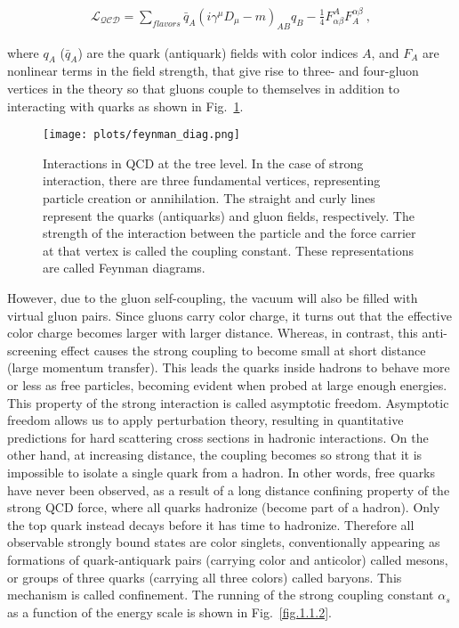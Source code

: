 \begin{equation}
    \label{eq.1.1}
    \begin{aligned}
        \mathcal{L_{QCD}}=\sum_{flavors}\bar{q}_{A}(i\gamma^{\mu}D_{\mu}-m)_{AB}q_{B}-\frac{1}{4}F^{A}_{\alpha\beta}F^{\alpha\beta}_{A}~,
    \end{aligned}
\end{equation}

\noindent where $q_A$ ($\bar{q}_{A}$) are the quark (antiquark) fields with color indices $A$, and $F_{A}$ are nonlinear terms in the field strength, that give rise to three- and four-gluon vertices in the theory so that gluons couple to themselves in addition to interacting with quarks as shown in Fig.~\ref{fig.1.1.1}.

\begin{figure}[H]
    \centering
        \texttt{[image: plots/feynman\_diag.png]}
        \caption{Interactions in QCD at the tree level. In the case of strong interaction, there are three fundamental vertices, representing particle creation or annihilation. The straight and curly lines represent the quarks (antiquarks) and gluon fields, respectively. The strength of the interaction between the particle and the force carrier at that vertex is called the coupling constant. These representations are called Feynman diagrams.}
        \label{fig.1.1.1}
\end{figure}

However, due to the gluon self-coupling, the vacuum will also be filled with virtual gluon pairs. Since gluons carry color charge, it turns out that the effective color charge becomes larger with larger distance. Whereas, in contrast, this anti-screening effect causes the strong coupling to become small at short distance (large momentum transfer). This leads the quarks inside hadrons to behave more or less as free particles, becoming evident when probed at large enough energies. This property of the strong interaction is called asymptotic freedom. Asymptotic freedom allows us to apply perturbation theory, resulting in quantitative predictions for hard scattering cross sections in hadronic interactions. On the other hand, at increasing distance, the coupling becomes so strong that it is impossible to isolate a single quark from a hadron. In other words, free quarks have never been observed, as a result of a long distance confining property of the strong QCD force, where all quarks hadronize (become part of a hadron). Only the top quark instead decays before it has time to hadronize. Therefore all observable strongly bound states are color singlets, conventionally appearing as formations of quark-antiquark pairs (carrying color and anticolor) called mesons, or groups of three quarks (carrying all three colors) called baryons. This mechanism is called confinement. The running of the strong coupling constant $\alpha_{s}$ as a function of the energy scale is shown in Fig.~\ref{fig.1.1.2}.

